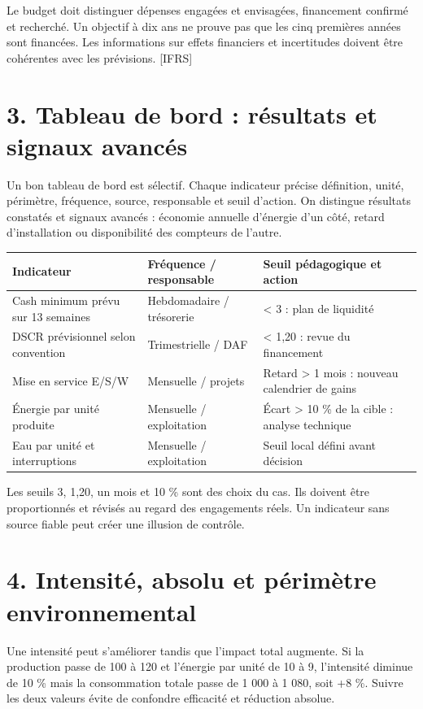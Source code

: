 \documentclass[12pt,a4paper]{article}
\begin{document}
Le budget doit distinguer dépenses engagées et envisagées, financement confirmé et recherché. Un objectif à dix ans ne prouve pas que les cinq premières années sont financées. Les informations sur effets financiers et incertitudes doivent être cohérentes avec les prévisions. [IFRS]

\section*{3. Tableau de bord : résultats et signaux avancés}
Un bon tableau de bord est sélectif. Chaque indicateur précise définition, unité, périmètre, fréquence, source, responsable et seuil d’action. On distingue résultats constatés et signaux avancés : économie annuelle d’énergie d’un côté, retard d’installation ou disponibilité des compteurs de l’autre.



\Needspace{250pt}
\begin{longtable}{p{5.07cm}p{5.07cm}p{5.07cm}}
\toprule
Indicateur & Fréquence / responsable & Seuil pédagogique et action \\
\midrule\endhead
Cash minimum prévu sur 13 semaines & Hebdomadaire / trésorerie & < 3 : plan de liquidité \\
DSCR prévisionnel selon convention & Trimestrielle / DAF & < 1,20 : revue du financement \\
Mise en service E/S/W & Mensuelle / projets & Retard > 1 mois : nouveau calendrier de gains \\
Énergie par unité produite & Mensuelle / exploitation & Écart > 10 \% de la cible : analyse technique \\
Eau par unité et interruptions & Mensuelle / exploitation & Seuil local défini avant décision \\
\bottomrule
\end{longtable}

Les seuils 3, 1,20, un mois et 10 \% sont des choix du cas. Ils doivent être proportionnés et révisés au regard des engagements réels. Un indicateur sans source fiable peut créer une illusion de contrôle.

\section*{4. Intensité, absolu et périmètre environnemental}
Une intensité peut s’améliorer tandis que l’impact total augmente. Si la production passe de 100 à 120 et l’énergie par unité de 10 à 9, l’intensité diminue de 10 \% mais la consommation totale passe de 1 000 à 1 080, soit +8 \%. Suivre les deux valeurs évite de confondre efficacité et réduction absolue.
\end{document}
